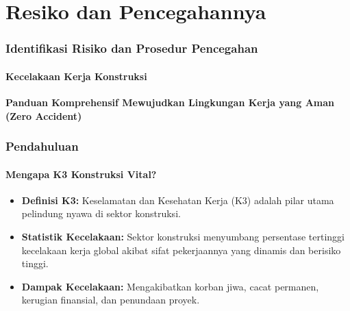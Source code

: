 \documentclass[../main.tex]{subfiles}
\begin{document}
\section{Resiko dan Pencegahannya}%
\label{sec:Resiko dan Pencegahannya}

\begin{frame}[mytitle=center, c, mycolor=digiPH_ocean, dark]
	\frametitle{Identifikasi Risiko dan Prosedur Pencegahan}
	\framesubtitle{Kecelakaan Kerja Konstruksi}

	\begin{center}
		\textbf{\Large Panduan Komprehensif Mewujudkan Lingkungan Kerja yang Aman (Zero Accident)}\\
		\vspace{0.8cm}
		\vspace{0.3cm}
	\end{center}

	\vspace{0.5cm}
\end{frame}

\begin{frame}[mytitle=standard, t]
	\frametitle{Pendahuluan}
	\framesubtitle{Mengapa K3 Konstruksi Vital?}

	\begin{itemize}
		\item \textbf{Definisi K3:} Keselamatan dan Kesehatan Kerja (K3) adalah pilar utama pelindung nyawa di sektor konstruksi.
		\item \textbf{Statistik Kecelakaan:} Sektor konstruksi menyumbang persentase tertinggi kecelakaan kerja global akibat sifat pekerjaannya yang dinamis dan berisiko tinggi.
		\item \textbf{Dampak Kecelakaan:} Mengakibatkan korban jiwa, cacat permanen, kerugian finansial, dan penundaan proyek.
	\end{itemize}

	\vfill
\end{frame}
\end{document}
